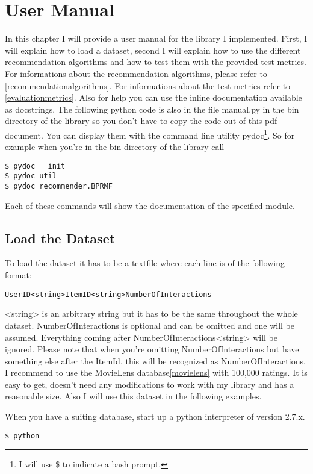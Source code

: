 \chapter{User Manual}
In this chapter I will provide a user manual for the library I implemented\cite{recsyslab}.
First, I will explain how to load a dataset, second I
will explain how to use the different recommendation algorithms and
how to test them with the provided test metrics. For informations about
the recommendation algorithms, please refer to \ref{recommendationalgorithms}.
For informations about the test metrics refer to \ref{evaluationmetrics}.
Also for help you can use the inline documentation available as docstrings.
The following python code is also in the file manual.py in the bin directory of the library
so you don't have to copy the code out of this pdf document.
You can display them with the command line utility
pydoc\footnote{I will use \$ to indicate a bash prompt.}. So for example when you're in the
bin directory of the library call

\begin{lstlisting}
$ pydoc __init__
$ pydoc util 
$ pydoc recommender.BPRMF
\end{lstlisting}

Each of these commands will show the documentation of the specified module.


\section{Load the Dataset}
To load the dataset it has to be a textfile where each line is of the following format:
\begin{lstlisting}
UserID<string>ItemID<string>NumberOfInteractions
\end{lstlisting}
<string> is an arbitrary string but it has to be the same throughout the whole dataset.
NumberOfInteractions is optional and can be omitted and one will be assumed.
Everything coming after NumberOfInteractions<string> will be ignored.
Please note that when you're omitting NumberOfInteractions but have something else after
the ItemId, this will be recognized as NumberOfInteractions.
I recommend to use the MovieLens database\ref{movielens} with 100,000 ratings.
It is easy to get, doesn't need any modifications to work with my library and has a
reasonable size. Also I will use this dataset in the following examples.

When you have a suiting database, start up a python interpreter of version 2.7.x.
\begin{lstlisting}
$ python
\end{lstlisting}

